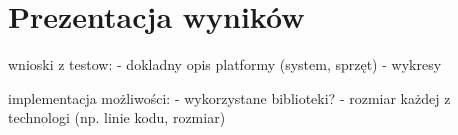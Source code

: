 \chapter{Prezentacja wyników}

wnioski z testow:
- dokladny opis platformy (system, sprzęt)
- wykresy


implementacja możliwości:
- wykorzystane biblioteki?
- rozmiar każdej z technologi (np. linie kodu, rozmiar)
